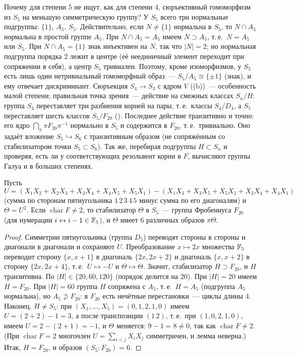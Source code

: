 Почему для степени $5$ не ищут, как для степени $4$, сюръективный гомоморфизм из $S_5$ на меньшую симметрическую группу?
У $S_5$ всего три нормальные подгруппы: $\{1\}$, $A_5$, $S_5$. Действительно, если $N\ne\{1\}$ нормальна в $S_5$, то
$N\cap A_5$ нормальна в простой группе $A_5$. При $N\cap A_5=A_5$ имеем $N\supset A_5$, т.\,е.\ $N=A_5$ или $S_5$. При
$N\cap A_5=\{1\}$ знак инъективен на $N$, так что $|N|=2$; но нормальная подгруппа порядка $2$ лежит в центре (её
неединичный элемент переходит при сопряжении в себя), а центр $S_5$ тривиален. Поэтому, кроме изоморфизмов, у $S_5$
есть лишь один нетривиальный гомоморфный образ~--- $S_5/A_5\cong\{\pm1\}$ (знак), и ему отвечает дискриминант.
Сюръекция $S_4\to S_3$ с ядром $V$ ((b))~--- особенность малой степени; правильная точка зрения~--- действие на
смежных классах $S_n/H$: группа $S_4$ переставляет три разбиения корней на пары, т.\,е.\ классы $S_4/D_4$, а $S_5$
переставляет шесть классов $S_5/F_{20}$ (). Последнее действие транзитивно и точно: его ядро
$\bigcap_\pi\pi F_{20}\pi^{-1}$ нормально в $S_5$ и содержится в $F_{20}$, т.\,е.\ тривиально. Оно задаёт вложение
$S_5\hookrightarrow S_6$ с транзитивным образом (не сопряжённым со стабилизатором точки $S_5\subset S_6$). Так же, перебирая
подгруппы $H\subset S_n$ и проверяя, есть ли у соответствующих резольвент корни в $F$, вычисляют группы Галуа и в
больших степенях.

\begin{lemma}[4.18d]
Пусть
\[
U=(X_1X_2+X_2X_3+X_3X_4+X_4X_5+X_5X_1)-(X_1X_3+X_3X_5+X_5X_2+X_2X_4+X_4X_1)
\]
\textup(сумма по сторонам пятиугольника $1\,2\,3\,4\,5$ минус сумма по его диагоналям\textup) и $\Theta=U^2$. Если
$\operatorname{char}F\ne2$, то стабилизатор $\Theta$ в $S_5$~--- группа Фробениуса $F_{20}$ \textup(для нумерации $i\leftrightarrow i-1\in\mathbb F_5$\textup), и $\Theta$ имеет
$6$ различных образов $\pi\Theta$.
\end{lemma}

\begin{proof}
Симметрии пятиугольника (группа $D_5$) переводят стороны в стороны и диагонали в диагонали и сохраняют $U$.
Преобразование $x\mapsto2x$ множества $\mathbb F_5$ переводит сторону $\{x,x+1\}$ в диагональ $\{2x,2x+2\}$ и диагональ
$\{x,x+2\}$ в сторону $\{2x,2x+4\}$, т.\,е.\ $U\mapsto-U$ и $\Theta\mapsto\Theta$. Значит, стабилизатор $H\supset F_{20}$, и $H$
транзитивна. По  $|H|\in\{20,60,120\}$ (порядок делится на $20$). При $|H|=20$ имеем $H=F_{20}$. При $|H|=60$
группа $H$ сопряжена с $A_5$, т.\,е.\ $H=A_5$ (подгруппа $A_5$ нормальна), но $A_5\not\supset F_{20}$: в $F_{20}$ есть
нечётные перестановки~--- циклы длины $4$. Наконец, $H\ne S_5$: при $(X_1,\dots,X_5)=(0,1,2,1,0)$ имеем $U=(2+2)-1=3$, а
после транспозиции $(1\,2)$, т.\,е.\ при $(1,0,2,1,0)$, имеем $U=2-(2+1)=-1$, и $\Theta$ меняется: $9-1=8\ne0$, так как
$\operatorname{char}F\ne2$. (При $\operatorname{char}F=2$ многочлен $U=\sum_{i<j}X_iX_j$ симметричен, и лемма неверна.) Итак,
$H=F_{20}$, и образов $(S_5:F_{20})=6$.
\end{proof}

